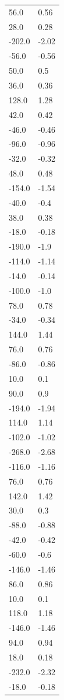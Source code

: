 \begin{longtable}{ll}
56.0 & 0.56 \\
28.0 & 0.28 \\
-202.0 & -2.02 \\
-56.0 & -0.56 \\
50.0 & 0.5 \\
36.0 & 0.36 \\
128.0 & 1.28 \\
42.0 & 0.42 \\
-46.0 & -0.46 \\
-96.0 & -0.96 \\
-32.0 & -0.32 \\
48.0 & 0.48 \\
-154.0 & -1.54 \\
-40.0 & -0.4 \\
38.0 & 0.38 \\
-18.0 & -0.18 \\
-190.0 & -1.9 \\
-114.0 & -1.14 \\
-14.0 & -0.14 \\
-100.0 & -1.0 \\
78.0 & 0.78 \\
-34.0 & -0.34 \\
144.0 & 1.44 \\
76.0 & 0.76 \\
-86.0 & -0.86 \\
10.0 & 0.1 \\
90.0 & 0.9 \\
-194.0 & -1.94 \\
114.0 & 1.14 \\
-102.0 & -1.02 \\
-268.0 & -2.68 \\
-116.0 & -1.16 \\
76.0 & 0.76 \\
142.0 & 1.42 \\
30.0 & 0.3 \\
-88.0 & -0.88 \\
-42.0 & -0.42 \\
-60.0 & -0.6 \\
-146.0 & -1.46 \\
86.0 & 0.86 \\
10.0 & 0.1 \\
118.0 & 1.18 \\
-146.0 & -1.46 \\
94.0 & 0.94 \\
18.0 & 0.18 \\
-232.0 & -2.32 \\
-18.0 & -0.18 \\

\end{longtable}
